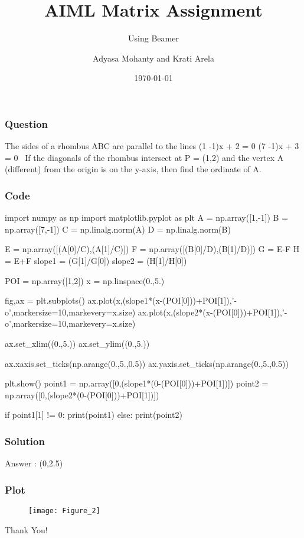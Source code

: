 \documentclass{beamer}
\title{AIML Matrix Assignment}
\subtitle{Using Beamer}
\author{Adyasa Mohanty and Krati Arela}
\institute{IIT Hyderabad}
\date{\today}
\begin{document}
\begin{frame}
\titlepage
\end{frame}

\begin{frame}
\frametitle{Question}
The sides of a rhombus ABC are parallel to the lines 
\linebreak (1 -1)x + 2 = 0
\linebreak(7 -1)x + 3 = 0
\linebreak\ If the diagonals of the rhombus intersect at P = (1,2) and the vertex A (different) from the origin is on the y-axis, then find the ordinate of A. 
\end{frame}

\begin{frame}[fragile]
\frametitle{Code}
\begin{semiverbatim}
import numpy as np
import matplotlib.pyplot as plt
A = np.array([1,-1])
B = np.array([7,-1])
C = np.linalg.norm(A)
D = np.linalg.norm(B)

E = np.array([(A[0]/C),(A[1]/C)])
F = np.array([(B[0]/D),(B[1]/D)])
G = E-F
H = E+F
slope1 = (G[1]/G[0])
slope2 = (H[1]/H[0])

POI = np.array([1,2])
x = np.linspace(0.,5.)
\end{semiverbatim}
\end{frame}

\begin{frame}[fragile]
\begin{semiverbatim}
fig,ax = plt.subplots()
ax.plot(x,(slope1*(x-(POI[0]))+POI[1]),'-o',markersize=10,markevery=x.size)
ax.plot(x,(slope2*(x-(POI[0]))+POI[1]),'-o',markersize=10,markevery=x.size)

ax.set_xlim((0.,5.))
ax.set_ylim((0.,5.))

ax.xaxis.set_ticks(np.arange(0.,5.,0.5))
ax.yaxis.set_ticks(np.arange(0.,5.,0.5))

plt.show()
point1 = np.array([0,(slope1*(0-(POI[0]))+POI[1])])
point2 = np.array([0,(slope2*(0-(POI[0]))+POI[1])])



\end{semiverbatim}
\end{frame}

\begin{frame}[fragile]
\begin{semiverbatim}

if point1[1] != 0:
\linebreak \tab \tab	print(point1)
else:
\linebreak \tab \tab	print(point2)
	

\end{semiverbatim}
\end{frame}


\begin{frame}
\frametitle{Solution}
Answer : (0,2.5)
\end{frame}

\begin{frame}
\frametitle{Plot}
\begin{figure}
\texttt{[image: Figure\_2]}
\end{figure}
\end{frame}


\begin{frame}
Thank You!
\end{frame}
\end{document}
